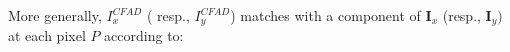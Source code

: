 \documentclass[twoside]{article}
\newcommand\Smo{\bar} %
\newcommand\D{I^{CFAD}} %
\newcommand\Dplus{I^{CFAD^+}}
\newcommand\Dmoins{I^{CFAD^-}}
\DeclareMathOperator{\e}{e}
\begin{document}
%
%
%	
%	
%	
%	
%	
%	
%	
%	
%	
%	
%	
%	
%	


More generally, $\D_x$ ( resp., $\D_y$) matches with a component of $\textbf{I}_x$ (resp., $\textbf{I}_y)$ at each pixel $P$ according to:
\end{document}
